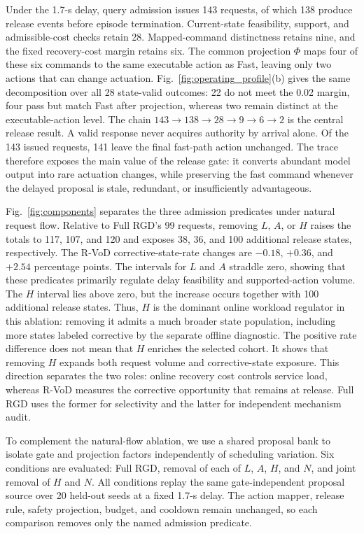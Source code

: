 \documentclass[letterpaper,journal]{IEEEtran}
\begin{document}
Under the 1.7-s delay, query admission issues 143 requests, of which 138
produce release events before episode termination. Current-state feasibility,
support, and admissible-cost checks retain 28. Mapped-command distinctness retains
nine, and the fixed recovery-cost margin retains six. The common projection
$\Phi$ maps four of these six commands to the same executable action as Fast,
leaving only two actions that can change actuation. Fig.~\ref{fig:operating_profile}(b)
gives the same decomposition over all 28 state-valid outcomes: 22 do not meet
the 0.02 margin, four pass but match Fast after projection, whereas two remain
distinct at the executable-action level. The chain $143\!\rightarrow\!138\!\rightarrow\!28\!\rightarrow\!9
\!\rightarrow\!6\!\rightarrow\!2$ is the central release result. A valid
response never acquires authority by arrival alone. Of the 143 issued requests,
141 leave the final fast-path action unchanged. The trace therefore exposes
the main value of the release gate: it converts abundant model output into rare
actuation changes, while preserving the fast command whenever the delayed
proposal is stale, redundant, or insufficiently advantageous.

Fig.~\ref{fig:components} separates the three admission predicates under
natural request flow. Relative to Full RGD's 99 requests, removing $L$, $A$,
or $H$ raises the totals to 117, 107, and 120 and exposes 38, 36, and 100
additional release states, respectively. The R-VoD corrective-state-rate
changes are $-0.18$, $+0.36$, and $+2.54$ percentage points. The intervals for
$L$ and $A$ straddle zero, showing that these predicates primarily regulate
delay feasibility and supported-action volume. The $H$ interval lies above
zero, but the increase occurs together with 100 additional release states.
Thus, $H$ is the dominant online workload regulator in this ablation: removing
it admits a much broader state population, including more states labeled
corrective by the separate offline diagnostic. The positive rate difference
does not mean that $H$ enriches the selected cohort. It shows that removing
$H$ expands both request volume and corrective-state exposure. This direction
separates the two roles: online recovery cost controls service load, whereas
R-VoD measures the corrective opportunity that remains at release. Full RGD
uses the former for selectivity and the latter for independent mechanism audit.

To complement the natural-flow ablation, we use a shared proposal bank to
isolate gate and projection factors independently of scheduling variation.
Six conditions are evaluated: Full RGD, removal of each of $L$, $A$, $H$,
and $N$, and joint removal of $H$ and $N$. All conditions replay the same
gate-independent proposal source over 20 held-out seeds at a fixed 1.7-s
delay. The action mapper, release rule, safety projection, budget, and
cooldown remain unchanged, so each comparison removes only the named
admission predicate.
\end{document}
